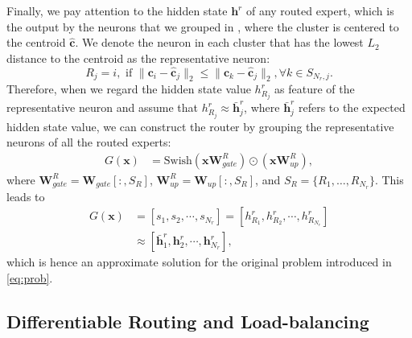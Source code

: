 Finally, we pay attention to the hidden state $\mathbf{h}^{r}$ of any routed expert, which is the output by the neurons that we grouped in , where the cluster is centered to the centroid $\hat{\mathbf{c}}$.
We denote the neuron in each cluster that has the lowest $L_2$ distance to the centroid as the representative neuron:
\begin{equation}
    R_j = i, \mbox{ if } \|\mathbf{c}_i-\hat{\mathbf{c}}_j\|_2 \leq \|\mathbf{c}_k-\hat{\mathbf{c}}_j\|_2, \forall k \in S_{N_r,j}.
\end{equation}
Therefore, when we regard the hidden state value $h^r_{R_j}$ as feature of the representative neuron and assume that $h^r_{R_j} \approx \bar{\mathbf{h}}^r_j$, where $\bar{\mathbf{h}}^r_j$ refers to the expected hidden state value, we can construct the router by grouping the representative neurons of all the routed experts:
\begin{align}
    G(\mathbf{x}) &= \text{Swish} (\mathbf{x}\mathbf{W}_{gate}^{R}) \odot (\mathbf{x}\mathbf{W}_{up}^{R}),  
\end{align}
where $\mathbf{W}_{gate}^{R} = \mathbf{W}_{gate}[:,S_{R}]$, $\mathbf{W}_{up}^{R} = \mathbf{W}_{up}[:,S_{R}]$, and $S_R = \{R_1, \dots,R_{N_r}\}$. This leads to  
\begin{align}
    G(\mathbf{x}) 
    &= \left[s_1,s_2,\cdots, s_{N_r}\right] 
    = \left[h^r_{R_1},h^r_{R_2},\cdots, h^r_{R_{N_r}}\right] \nonumber \\
    &\approx \left[\bar{\mathbf{h}}^r_1,\mathbf{h}^r_2,\cdots, \mathbf{h}^r_{N_r}\right],
\end{align}
which is hence an approximate solution for the original problem introduced in \eqref{eq:prob}. 





\subsection{Differentiable Routing and Load-balancing}
\label{sec:diff}

